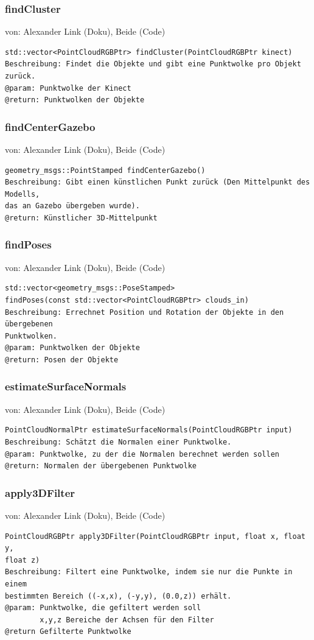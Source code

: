 \documentclass{suturo}
\makeatletter
\newcommand{\chapterauthor}[1]{%
  {\parindent0pt\vspace*{-27pt}%
  \linespread{0}\small\begin{flushright}von: #1\end{flushright}%
  \par\nobreak\vspace*{0pt}}
  \@afterheading%
}
\makeatother
\begin{document}
\subsubsection{findCluster}
\chapterauthor{Alexander Link (Doku), Beide (Code)}
\begin{verbatim}
std::vector<PointCloudRGBPtr> findCluster(PointCloudRGBPtr kinect)
Beschreibung: Findet die Objekte und gibt eine Punktwolke pro Objekt zurück.
@param: Punktwolke der Kinect
@return: Punktwolken der Objekte
\end{verbatim}\label{func:findcluster}

\subsubsection{findCenterGazebo}
\chapterauthor{Alexander Link (Doku), Beide (Code)}
\begin{verbatim}
geometry_msgs::PointStamped findCenterGazebo()
Beschreibung: Gibt einen künstlichen Punkt zurück (Den Mittelpunkt des
Modells, 
das an Gazebo übergeben wurde).
@return: Künstlicher 3D-Mittelpunkt
\end{verbatim}\label{func:findcentergazebo}


\subsubsection{findPoses}
\chapterauthor{Alexander Link (Doku), Beide (Code)}
\begin{verbatim}
std::vector<geometry_msgs::PoseStamped> 
findPoses(const std::vector<PointCloudRGBPtr> clouds_in)
Beschreibung: Errechnet Position und Rotation der Objekte in den übergebenen
Punktwolken.
@param: Punktwolken der Objekte
@return: Posen der Objekte
\end{verbatim}\label{func:findposes}

\subsubsection{estimateSurfaceNormals}
\chapterauthor{Alexander Link (Doku), Beide (Code)}
\begin{verbatim}
PointCloudNormalPtr estimateSurfaceNormals(PointCloudRGBPtr input)
Beschreibung: Schätzt die Normalen einer Punktwolke.
@param: Punktwolke, zu der die Normalen berechnet werden sollen
@return: Normalen der übergebenen Punktwolke
\end{verbatim}\label{func:estimatesurfacenormals}

\subsubsection{apply3DFilter}
\chapterauthor{Alexander Link (Doku), Beide (Code)}
\begin{verbatim}
PointCloudRGBPtr apply3DFilter(PointCloudRGBPtr input, float x, float y, 
float z)
Beschreibung: Filtert eine Punktwolke, indem sie nur die Punkte in einem
bestimmten Bereich ((-x,x), (-y,y), (0.0,z)) erhält.
@param: Punktwolke, die gefiltert werden soll
		x,y,z Bereiche der Achsen für den Filter
@return Gefilterte Punktwolke
\end{verbatim}\label{func:apply3dfilter}
\end{document}
